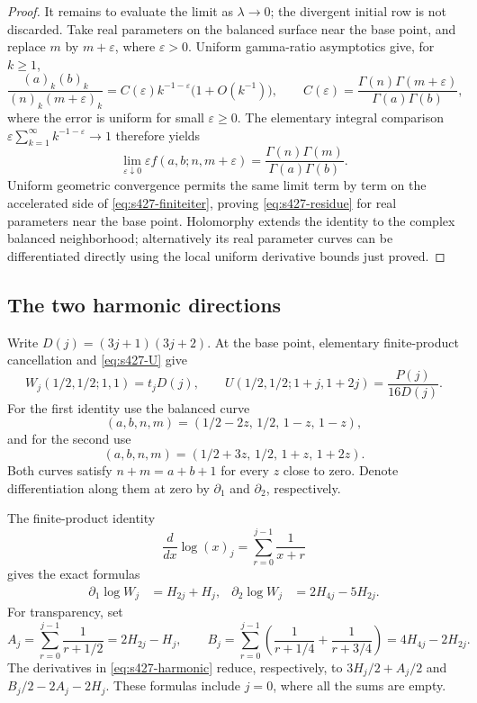 \documentclass[11pt,a4paper]{article}
\theoremstyle{remark}\newtheorem{remark}[theorem]{Remark}
\numberwithin{equation}{section}
\begin{document}
\begin{proof}
It remains to evaluate the limit as $\lambda\to0$; the divergent
initial row is not discarded. Take real parameters on the balanced
surface near the base point, and replace $m$ by $m+\varepsilon$,
where $\varepsilon>0$. Uniform gamma-ratio asymptotics give, for $k\ge1$,
\[
 \frac{(a)_k(b)_k}{(n)_k(m+\varepsilon)_k}
 =C(\varepsilon)k^{-1-\varepsilon}
   \bigl(1+O(k^{-1})\bigr),\qquad
 C(\varepsilon)=\frac{\Gamma(n)\Gamma(m+\varepsilon)}
 {\Gamma(a)\Gamma(b)},
\]
where the error is uniform for small $\varepsilon\ge0$.
The elementary integral comparison
$\varepsilon\sum_{k=1}^{\infty}k^{-1-\varepsilon}\to1$
therefore yields
\[
 \lim_{\varepsilon\downarrow0}
 \varepsilon f(a,b;n,m+\varepsilon)
 =\frac{\Gamma(n)\Gamma(m)}{\Gamma(a)\Gamma(b)}.
\]
Uniform geometric convergence permits the same limit term by term
on the accelerated side of \eqref{eq:s427-finiteiter}, proving
\eqref{eq:s427-residue} for real parameters near the base point.
Holomorphy extends the identity to the complex balanced neighborhood;
alternatively its real parameter curves can be differentiated directly
using the local uniform derivative bounds just proved.
\end{proof}

\subsection{The two harmonic directions}

Write $D(j)=(3j+1)(3j+2)$. At the base point, elementary finite-product
cancellation and \eqref{eq:s427-U} give
\begin{equation}\label{eq:s427-base}
 W_j(1/2,1/2;1,1)=t_jD(j),\qquad
 U(1/2,1/2;1+j,1+2j)=\frac{P(j)}{16D(j)}.
\end{equation}
For the first identity use the balanced curve
\[
 (a,b,n,m)=(1/2-2z,\,1/2,\,1-z,\,1-z),
\]
and for the second use
\[
 (a,b,n,m)=(1/2+3z,\,1/2,\,1+z,\,1+2z).
\]
Both curves satisfy $n+m=a+b+1$ for every $z$ close to zero.
Denote differentiation along them at zero by $\partial_1$ and
$\partial_2$, respectively.

The finite-product identity
\[
 \frac{d}{dx}\log(x)_j=\sum_{r=0}^{j-1}\frac1{x+r}
\]
gives the exact formulas
\begin{align}
 \partial_1\log W_j&=H_{2j}+H_j,&
 \partial_2\log W_j&=2H_{4j}-5H_{2j}.
 \label{eq:s427-harmonic}
\end{align}
For transparency, set
\[
 A_j=\sum_{r=0}^{j-1}\frac1{r+1/2}=2H_{2j}-H_j,\qquad
 B_j=\sum_{r=0}^{j-1}\left(\frac1{r+1/4}+\frac1{r+3/4}\right)
       =4H_{4j}-2H_{2j}.
\]
The derivatives in \eqref{eq:s427-harmonic} reduce, respectively,
to $3H_j/2+A_j/2$ and $B_j/2-2A_j-2H_j$.
These formulas include $j=0$, where all the sums are empty.
\end{document}

